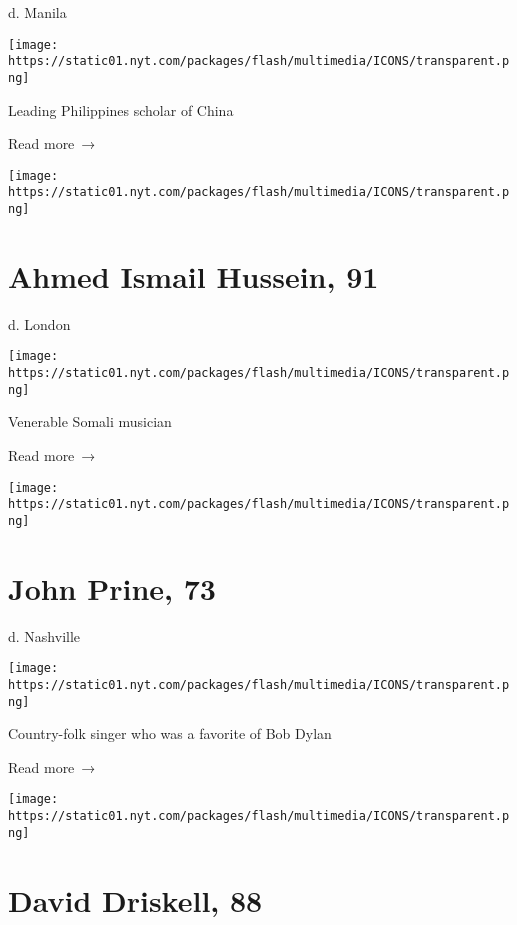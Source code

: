 d. Manila

\texttt{[image: https://static01.nyt.com/packages/flash/multimedia/ICONS/transparent.png]}

Leading Philippines scholar of China

 Read more~→

\href{https://www.nytimes.com/2020/04/08/obituaries/ahmed-ismail-hussein-dead-coronavirus.html}{}

\texttt{[image: https://static01.nyt.com/packages/flash/multimedia/ICONS/transparent.png]}

\hypertarget{ahmed-ismail-hussein-91}{%
\section{Ahmed Ismail Hussein, 91}\label{ahmed-ismail-hussein-91}}

d. London

\texttt{[image: https://static01.nyt.com/packages/flash/multimedia/ICONS/transparent.png]}

Venerable Somali musician

 Read more~→

\href{https://www.nytimes.com/2020/04/07/arts/music/john-prine-dead-coronavirus.html}{}

\texttt{[image: https://static01.nyt.com/packages/flash/multimedia/ICONS/transparent.png]}

\hypertarget{john-prine-73}{%
\section{John Prine, 73}\label{john-prine-73}}

d. Nashville

\texttt{[image: https://static01.nyt.com/packages/flash/multimedia/ICONS/transparent.png]}

Country-folk singer who was a favorite of Bob Dylan

 Read more~→

\href{https://www.nytimes.com/2020/04/07/obituaries/david-driskell-dead.html}{}

\texttt{[image: https://static01.nyt.com/packages/flash/multimedia/ICONS/transparent.png]}

\hypertarget{david-driskell-88}{%
\section{David Driskell, 88}\label{david-driskell-88}}


